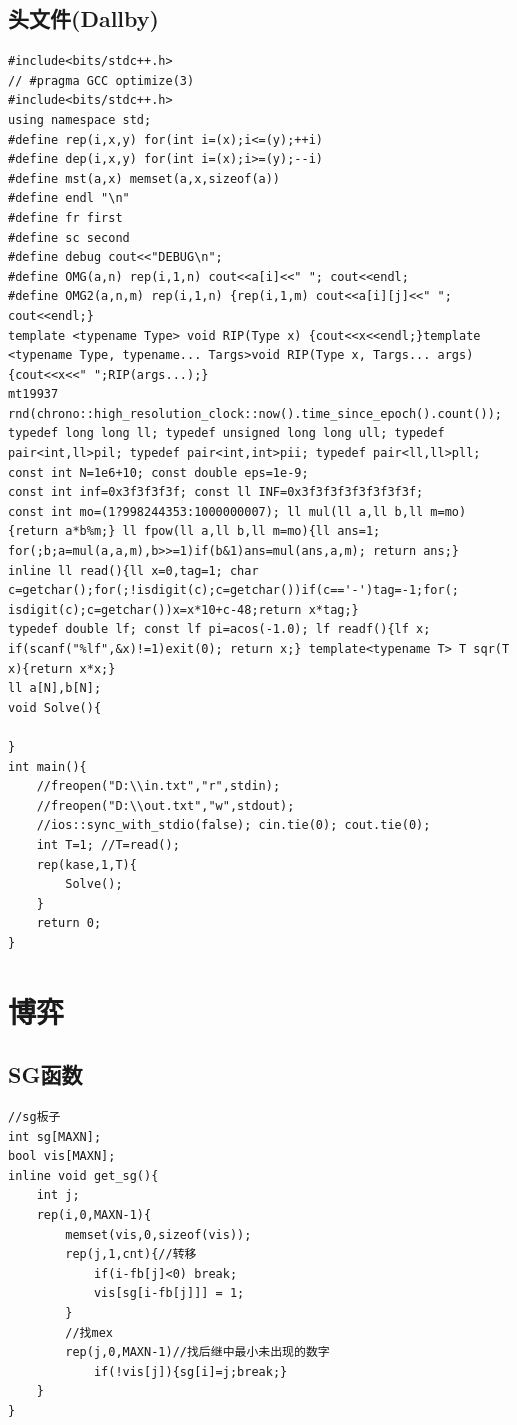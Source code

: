 \documentclass[a4]{ctexart}
\begin{document}
\subsection{头文件(Dallby)}
\begin{lstlisting}
#include<bits/stdc++.h>
// #pragma GCC optimize(3)
#include<bits/stdc++.h>
using namespace std;
#define rep(i,x,y) for(int i=(x);i<=(y);++i)
#define dep(i,x,y) for(int i=(x);i>=(y);--i)
#define mst(a,x) memset(a,x,sizeof(a))
#define endl "\n"
#define fr first
#define sc second
#define debug cout<<"DEBUG\n";
#define OMG(a,n) rep(i,1,n) cout<<a[i]<<" "; cout<<endl;
#define OMG2(a,n,m) rep(i,1,n) {rep(i,1,m) cout<<a[i][j]<<" "; cout<<endl;}
template <typename Type> void RIP(Type x) {cout<<x<<endl;}template <typename Type, typename... Targs>void RIP(Type x, Targs... args) {cout<<x<<" ";RIP(args...);}
mt19937 rnd(chrono::high_resolution_clock::now().time_since_epoch().count());
typedef long long ll; typedef unsigned long long ull; typedef pair<int,ll>pil; typedef pair<int,int>pii; typedef pair<ll,ll>pll;
const int N=1e6+10; const double eps=1e-9;
const int inf=0x3f3f3f3f; const ll INF=0x3f3f3f3f3f3f3f3f;
const int mo=(1?998244353:1000000007); ll mul(ll a,ll b,ll m=mo){return a*b%m;} ll fpow(ll a,ll b,ll m=mo){ll ans=1; for(;b;a=mul(a,a,m),b>>=1)if(b&1)ans=mul(ans,a,m); return ans;}
inline ll read(){ll x=0,tag=1; char c=getchar();for(;!isdigit(c);c=getchar())if(c=='-')tag=-1;for(; isdigit(c);c=getchar())x=x*10+c-48;return x*tag;}
typedef double lf; const lf pi=acos(-1.0); lf readf(){lf x; if(scanf("%lf",&x)!=1)exit(0); return x;} template<typename T> T sqr(T x){return x*x;}
ll a[N],b[N];
void Solve(){

}
int main(){
    //freopen("D:\\in.txt","r",stdin);
    //freopen("D:\\out.txt","w",stdout);
    //ios::sync_with_stdio(false); cin.tie(0); cout.tie(0);
    int T=1; //T=read();
    rep(kase,1,T){
        Solve();
    }
    return 0;
}
\end{lstlisting}
 \newpage

\section{博弈}
\subsection{SG函数}
\begin{lstlisting}
//sg板子
int sg[MAXN];
bool vis[MAXN];
inline void get_sg(){
    int j;
    rep(i,0,MAXN-1){
        memset(vis,0,sizeof(vis));
        rep(j,1,cnt){//转移
            if(i-fb[j]<0) break;
            vis[sg[i-fb[j]]] = 1;
        }
        //找mex
        rep(j,0,MAXN-1)//找后继中最小未出现的数字
            if(!vis[j]){sg[i]=j;break;}
    }
}
\end{lstlisting}
\end{document}
